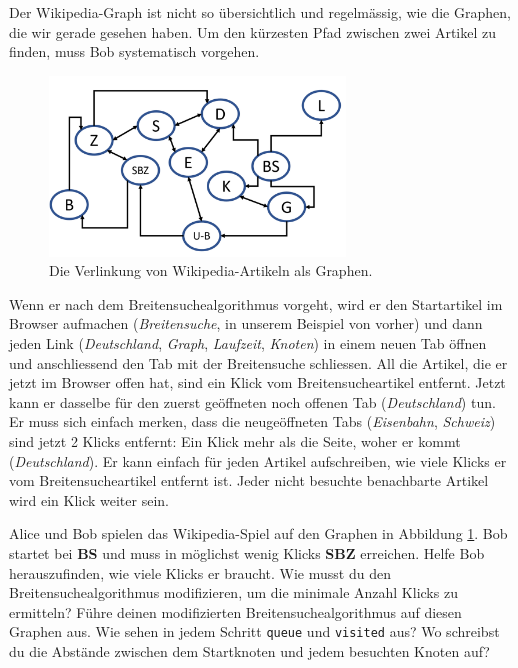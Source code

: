 Der Wikipedia-Graph ist nicht so übersichtlich und regelmässig, wie die Graphen, die wir gerade gesehen haben. Um den kürzesten Pfad zwischen zwei Artikel zu finden, muss Bob systematisch vorgehen. 
\begin{figure}[H]
    \centering
    \includegraphics[width=0.7\textwidth]{Pictures/Wikipedia.PNG} 
    \caption{Die Verlinkung von Wikipedia-Artikeln als Graphen.}
    \label{fig:wikipedia_graph}
\end{figure}

Wenn er nach dem Breitensuchealgorithmus vorgeht, wird er den Startartikel im Browser aufmachen (\textit{Breitensuche}, in unserem Beispiel von vorher) und dann jeden Link (\textit{Deutschland}, \textit{Graph}, \textit{Laufzeit}, \textit{Knoten}) in einem neuen Tab öffnen und anschliessend den Tab mit der Breitensuche schliessen. All die Artikel, die er jetzt im Browser offen hat, sind ein Klick vom Breitensucheartikel entfernt. Jetzt kann er dasselbe für den zuerst geöffneten noch offenen Tab (\textit{Deutschland}) tun. Er muss sich einfach merken, dass die neugeöffneten Tabs (\textit{Eisenbahn}, \textit{Schweiz}) sind jetzt 2 Klicks entfernt: Ein Klick mehr als die Seite, woher er kommt (\textit{Deutschland}). Er kann einfach für jeden Artikel aufschreiben, wie viele Klicks er vom Breitensucheartikel entfernt ist. Jeder nicht besuchte benachbarte Artikel wird ein Klick weiter sein.

\begin{aufgabe}\label{aufgabe_wikipedia_spiel}
Alice und Bob spielen das Wikipedia-Spiel auf den Graphen in Abbildung \ref{fig:wikipedia_graph}. Bob startet bei \textbf{BS} und muss in möglichst wenig Klicks \textbf{SBZ} erreichen. Helfe Bob herauszufinden, wie viele Klicks er braucht. Wie musst du den Breitensuchealgorithmus modifizieren, um die minimale Anzahl Klicks zu ermitteln? Führe deinen modifizierten Breitensuchealgorithmus auf diesen Graphen aus. Wie sehen in jedem Schritt \texttt{queue} und \texttt{visited} aus? Wo schreibst du die Abstände zwischen dem Startknoten und jedem besuchten Knoten auf?
\end{aufgabe}

